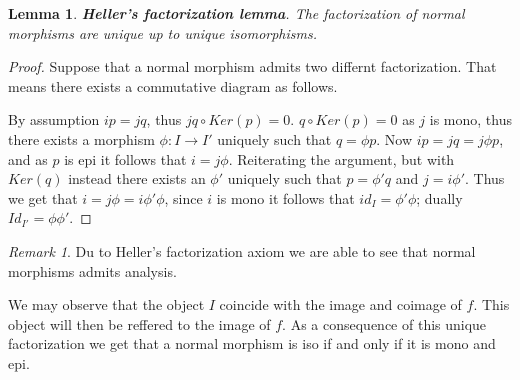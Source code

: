 \documentclass[11pt]{article}
\newtheorem{lemma}[theorem]{Lemma}
\theoremstyle{definition}
\theoremstyle{remark}
\newtheorem*{remark}{Remark}
\begin{document}
            \begin{lemma}
                \textbf{Heller's factorization lemma}. The factorization of normal morphisms are unique up to unique isomorphisms.
            \end{lemma}

            \begin{proof}
                Suppose that a normal morphism admits two differnt factorization. That means there exists a commutative diagram as follows.
                \begin{center}
                \end{center}
                By assumption $ip=jq$, thus $jq\circ Ker(p)=0$. $q\circ Ker(p)=0$ as $j$ is mono, thus there exists a morphism $\phi:I\rightarrow I'$ uniquely such that $q=\phi p$. Now $ip=jq=j\phi p$, and as $p$ is epi it follows that $i=j\phi$. Reiterating the argument, but with $Ker(q)$ instead there exists an $\phi '$ uniquely such that $p = \phi 'q$ and $j=i\phi '$. Thus we get that $i=j\phi = i\phi '\phi$, since $i$ is mono it follows that $id_I=\phi '\phi$; dually $Id_{I'}=\phi\phi '$.
            \end{proof}

            \begin{remark}
                Du to Heller's factorization axiom we are able to see that normal morphisms admits analysis.

                \begin{center}
                \end{center}

                We may observe that the object $I$ coincide with the image and coimage of $f$. This object will then be reffered to the image of $f$. As a consequence of this unique factorization we get that a normal morphism is iso if and only if it is mono and epi.
            \end{remark}
\end{document}
